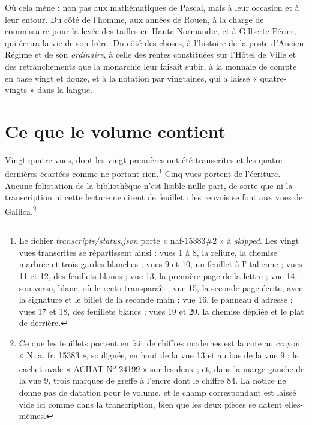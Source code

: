 \documentclass[11pt,a4paper]{article}
\begin{document}
\begin{resume}
Où cela mène : non pas aux mathématiques de Pascal, mais à leur occasion et à
leur entour. Du côté de l'homme, aux années de Rouen, à la charge de
commissaire pour la levée des tailles en Haute-Normandie, et à Gilberte Périer,
qui écrira la vie de son frère. Du côté des choses, à l'histoire
de la poste d'Ancien Régime et de son \emph{ordinaire}, à celle des rentes
constituées sur l'Hôtel de Ville et des retranchements que la monarchie leur
faisait subir, à la monnaie de compte en base vingt et douze, et à la notation
par vingtaines, qui a laissé « quatre-vingts » dans la langue.

\end{resume}

\section*{Ce que le volume contient}

Vingt-quatre vues, dont les vingt premières ont été transcrites et les quatre
dernières écartées comme ne portant rien.\footnote{Le fichier
\emph{transcripts/status.json} porte « naf-15383\#2 » à \emph{skipped}. Les
vingt vues transcrites se répartissent ainsi : vues 1 à 8, la reliure, la
chemise marbrée et trois gardes blanches ; vues 9 et 10, un feuillet à
l'italienne ; vues 11 et 12, des feuillets blancs ; vue 13, la première page
de la lettre ; vue 14, son verso, blanc, où le recto transparaît ; vue 15, la
seconde page écrite, avec la signature et le billet de la seconde main ; vue
16, le panneau d'adresse ; vues 17 et 18, des feuillets blancs ; vues 19 et
20, la chemise dépliée et le plat de derrière.} Cinq vues portent de
l'écriture. Aucune foliotation de la bibliothèque n'est lisible nulle part,
de sorte que ni la transcription ni cette lecture ne citent de feuillet :
les renvois se font aux vues de Gallica.\footnote{Ce que les feuillets portent
en fait de chiffres modernes est la cote au crayon « N. a. fr. 15383 »,
soulignée, en haut de la vue 13 et au bas de la vue 9 ; le cachet ovale
« ACHAT N\textsuperscript{o} 24199 » sur les deux ; et, dans la marge gauche de
la vue 9, trois marques de greffe à l'encre dont le chiffre 84. La notice ne
donne pas de datation pour le volume, et le champ correspondant est laissé
vide ici comme dans la transcription, bien que les deux pièces se datent
elles-mêmes.}
\end{document}
